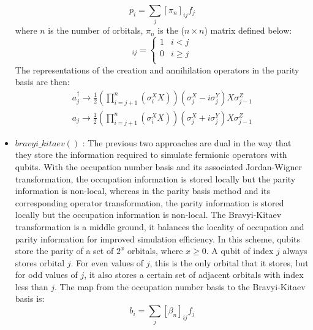 \begin{itemize}
\begin{equation}
              p_i = \sum_j {[\pi_n]_{ij} f_j}
          \end{equation}
          where $n$ is the number of orbitals, $\pi_n$ is the ($n \times n$) matrix defined below:
          \begin{equation}
              [\pi_n]_{ij} =
              \begin{cases}
                  1 & i<j     \\
                  0 & i\geq j \\
              \end{cases}
          \end{equation}
          The representations of the creation and annihilation operators in the parity basis are then:
          \begin{equation}
              \begin{split}
                  a_j^{\dagger} \to \frac{1}{2} (\prod_{i=j+1}^n ({\sigma}^X_i X))({\sigma}^X_j - i{\sigma}^Y_j) X {\sigma}^Z_{j-1} \\
                  a_j \to \frac{1}{2} (\prod_{i=j+1}^n ({\sigma}^X_i X))({\sigma}^X_j + i{\sigma}^Y_j) X {\sigma}^Z_{j-1}
              \end{split}
          \end{equation}
    \item $bravyi\_kitaev()$ \cite{bravyi2002fermionic, fenwick1994new}: The previous two approaches are dual in the way that they store the information required to simulate fermionic operators with qubits. With the occupation number basis and its associated Jordan-Wigner transformation, the occupation information is stored locally but the parity information is non-local, whereas in the parity basis method and its corresponding operator transformation, the parity information is stored locally but the occupation information is non-local.
          The Bravyi-Kitaev transformation is a middle ground, it balances the locality of occupation and parity information for improved simulation efficiency. In this scheme, qubits store the parity of a set of $2^x$ orbitals, where $x \geq 0$. A qubit of index $j$ always stores orbital $j$. For even values of $j$, this is the only orbital that it stores, but for odd values of $j$, it also stores a certain set of adjacent orbitals with index less than $j$. The map from the occupation number basis to the Bravyi-Kitaev basis is:
          \begin{equation}
              b_i = \sum_j {[\beta_n]_{ij} f_j}
          \end{equation}

\end{itemize}
